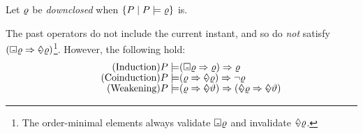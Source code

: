   Let $\varrho$ be \emph{downclosed} when
  $\{ P \mid P \models \varrho \}$ is.


  The past operators do not include the current instant, and so
  do \emph{not} satisfy
  $(\Box\mkern-8.8mu\text{-}\mkern3mu\varrho\Rightarrow\Diamond\mkern-10.1mu\text{-}\mkern4mu\varrho)$\footnote{The order-minimal elements always validate
    $\Box\mkern-8.8mu\text{-}\mkern3mu\varrho$ and invalidate
    $\Diamond\mkern-10.1mu\text{-}\mkern4mu\varrho$.}.
  However, the following hold:
\begin{align*}
  \tag{Induction}
  \aPS \models& (\always\afo \Rightarrow\afo) \Rightarrow\afo
  \\[-1ex]
  \tag{Coinduction}
  \aPS \models& (\afo \Rightarrow\once{\afo}) \Rightarrow\lnot \afo
  \\[-1ex]
  \tag{Weakening}
  \aPS \models& (\afo \Rightarrow\once{\bfo}) \Rightarrow (\once\afo \Rightarrow\once{\bfo})
\end{align*}

